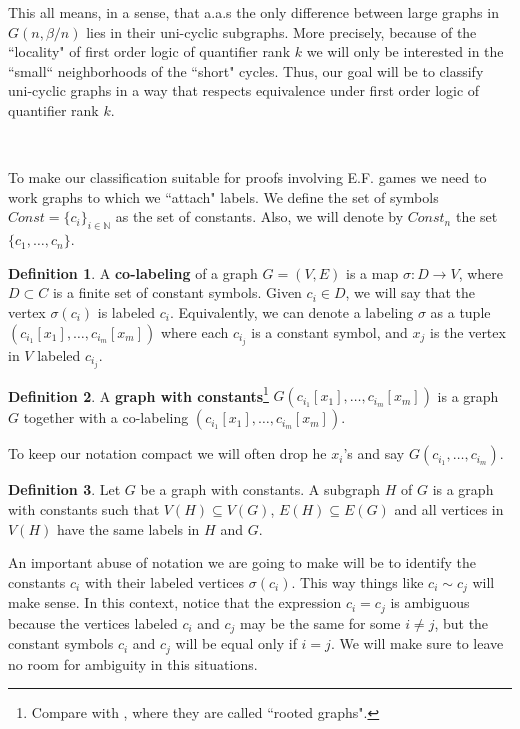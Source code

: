 \documentclass[11pt,notitlepage]{report}
\theoremstyle{definition}
\newtheorem{definition}{Definition}[chapter]
\newcommand{\N}{\mathbb{N}}
\begin{document}
This all means, in a sense, that a.a.s the only 
difference between large graphs in $G(n,\beta/n)$
lies in their uni-cyclic subgraphs. More precisely,
because of the ``locality" of first order logic of quantifier 
rank $k$ we will only be interested in the 
``small`` neighborhoods of the ``short" cycles.  
Thus, our goal will be to classify uni-cyclic graphs
in a way that respects equivalence under first 
order logic of quantifier rank $k$. \par
~\par
To make our classification suitable for proofs 
involving E.F. games we need to work graphs to which we ``attach" labels. 
We define the set of symbols $Const=\{c_i\}_{i\in \N}$ 
as the set of constants. Also, we will denote by
$Const_n$ the set $\{c_1,\dots, c_n\}$.
 
\begin{definition} 
	A \textbf{co-labeling} of a graph $G=(V,E)$ is a map 
	$\sigma: D\rightarrow V$, where $D\subset C$ is a 
	finite set of constant symbols. Given $c_i\in D$, 
	we will say that the vertex $\sigma(c_i)$ is labeled $c_i$.
	Equivalently, we can denote a labeling $\sigma$ as a tuple
	$(c_{i_1}[x_1],\dots, c_{i_m}[x_m])$ where each $c_{i_j}$
	 is a constant symbol, and $x_j$ is the vertex
	in $V$ labeled $c_{i_j}$.
\end{definition}

\begin{definition} 
	A \textbf{graph with constants}\footnote{
		Compare with \cite{lynch1992probabilities}, where they are called ``rooted graphs". 
		}
	$G(c_{i_1}[x_1],\dots, c_{i_m}[x_m])$ 
	is a graph $G$ together with a co-labeling 
	$(c_{i_1}[x_1],\dots, c_{i_m}[x_m])$. 
\end{definition}

To keep our notation compact we will often drop 
he $x_i$'s and say $G(c_{i_1},\dots, c_{i_m})$. \par

\begin{definition}
Let $G$ be a graph with constants. A subgraph $H$ of $G$ is
a graph with constants such that $V(H)\subseteq V(G)$, $E(H)\subseteq E(G)$ and 
all vertices in $V(H)$ have the same labels in $H$ and $G$. 
\end{definition}


An important abuse of notation we are going to make
will be to identify the constants $c_i$ with their labeled
vertices $\sigma(c_i)$. This way things like $c_i\sim c_j$ 
will make sense. In this context, notice that the expression
$c_i=c_j$ is ambiguous because the vertices labeled $c_i$ and $c_j$ 
may be the same for some $i\neq j$, but 
the constant symbols $c_i$ and $c_j$ will be equal only if $i=j$. 
We will make sure to leave no room for ambiguity in this situations. \par
\end{document}

